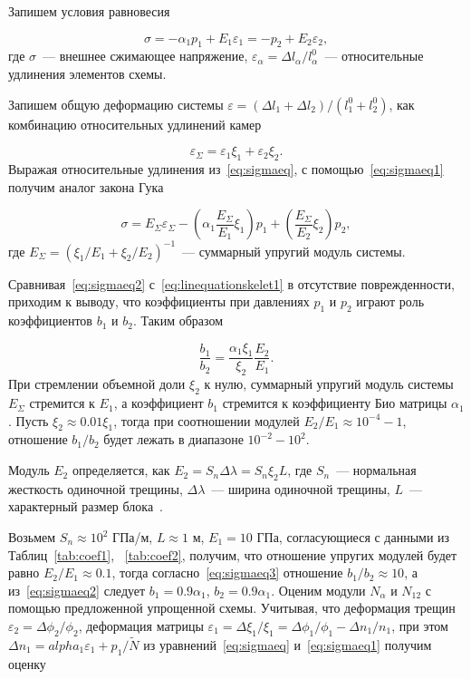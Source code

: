 Запишем условия равновесия

\begin{equation}
  \label{eq:sigmaeq}
  \sigma = - \alpha_1 p_1 + E_1 \varepsilon_1 = - p_2 + E_2 \varepsilon_2,
\end{equation}
где $\sigma$~--- внешнее сжимающее напряжение, $\varepsilon_{\alpha} = \Delta l_{\alpha} / l_{\alpha}^0$~--- относительные удлинения элементов схемы.

Запишем общую деформацию системы $\varepsilon =  (\Delta l_1 + \Delta l_2) / (l_1^0 + l_2^0)$, как комбинацию относительных удлинений камер

\begin{equation}
  \label{eq:sigmaeq1}
  \varepsilon_{\Sigma} = \varepsilon_1 \xi_1 + \varepsilon_2 \xi_2.
\end{equation}
Выражая относительные удлинения из~\eqref{eq:sigmaeq}, с помощью~\eqref{eq:sigmaeq1} получим аналог закона Гука

\begin{equation}
  \label{eq:sigmaeq2}
  \sigma = E_{\Sigma} \varepsilon_{\Sigma} - \left( \alpha_1 \frac{E_{\Sigma}}{E_1} \xi_1 \right) p_1 + \left( \frac{E_{\Sigma}}{E_2} \xi_2 \right) p_2,
\end{equation}
где $E_{\Sigma} = (\xi_1 / E_1 + \xi_2 / E_2)^{-1}$~--- суммарный упругий модуль системы.

Сравнивая~\eqref{eq:sigmaeq2} с~\eqref{eq:linequationskelet1} в отсутствие поврежденности, приходим к выводу, что коэффициенты при давлениях $p_1$ и $p_2$ играют роль коэффициентов $b_1$ и $b_2$. Таким образом

\begin{equation}
  \label{eq:sigmaeq3}
  \frac{b_1}{b_2} = \frac{\alpha_1 \xi_1}{\xi_2} \frac{E_2}{E_1}.
\end{equation}
При стремлении объемной доли $\xi_2$ к нулю, суммарный упругий модуль системы $E_{\Sigma}$ стремится к $E_1$, а коэффициент $b_1$ стремится к коэффициенту Био матрицы $\alpha_1$. Пусть $\xi_2 \approx 0.01 \xi_1$, тогда при соотношении модулей $E_2/E_1 \approx 10^{-4} - 1$, отношение $b_1/b_2$ будет лежать в диапазоне $10^{-2} - 10^2$.

Модуль $E_2$ определяется, как $E_2 = S_n \Delta \lambda = S_n \xi_2 L$, где $S_n$~--- нормальная жесткость одиночной трещины, $\Delta \lambda$~--- ширина одиночной трещины, $L$~--- характерный размер блока~\autocite{kocharyan2016}.

Возьмем $S_n \approx 10^2$ ГПа/м, $L \approx 1$ м, $E_1 = 10$ ГПа, согласующиеся с данными из Таблиц~\ref{tab:coef1}, ~\ref{tab:coef2}, получим, что отношение упругих модулей будет равно $E_2/E_1 \approx 0.1$, тогда согласно~\eqref{eq:sigmaeq3} отношение $b_1/b_2 \approx 10$, а из~\eqref{eq:sigmaeq2} следует $b_1 = 0.9 \alpha_1$, $b_2 = 0.9 \alpha_1$.
Оценим модули $N_{\alpha}$ и $N_{12}$ с помощью предложенной упрощенной схемы. Учитывая, что деформация трещин $\varepsilon_2 = \Delta \phi_2/\phi_2$, деформация матрицы $\varepsilon_1 = \Delta \xi_1 / \xi_1 = \Delta \phi_1 / \phi_1 - \Delta n_1 / n_1$, при этом $\Delta n_1 = alpha_1 \varepsilon_1 + p_1 / \widetilde{N}$ из уравнений~\eqref{eq:sigmaeq} и~\eqref{eq:sigmaeq1} получим оценку

